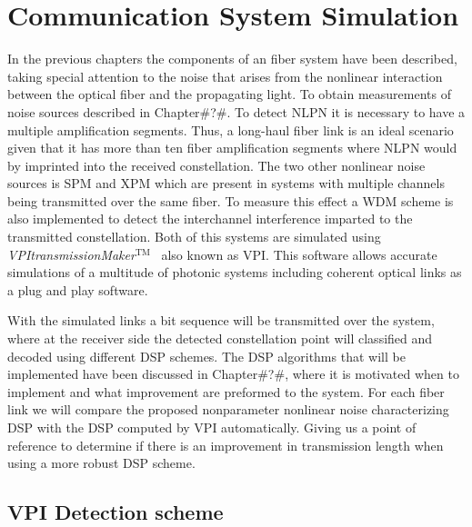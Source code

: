 
\chapter{Communication System Simulation }\label{ch:simu}
In the previous chapters the components of an fiber system have been described, taking special attention to the noise that arises from the nonlinear interaction between the optical fiber and the propagating light. To obtain measurements of noise sources described in Chapter\#?\#. To detect NLPN it is necessary to have a multiple amplification segments. Thus, a long-haul fiber link is an ideal scenario given that it has more than ten fiber amplification segments where NLPN would by imprinted into the received constellation. The two other nonlinear noise sources is SPM and XPM which are present in systems with multiple channels being transmitted over the same fiber. To measure this effect a WDM scheme is also implemented to detect the interchannel interference imparted to the transmitted constellation. Both of this systems are simulated using  \emph{VPItransmissionMaker$^\text{TM}$}~\cite{transmissionvpi} also known as VPI. This software allows accurate simulations of a multitude of photonic systems including coherent optical links as a plug and play software.


With the simulated links a bit sequence will be transmitted over the system, where at the receiver side the detected constellation point will classified and decoded using different DSP schemes. The DSP algorithms that will be implemented have been discussed in Chapter\#?\#, where it is motivated when to implement and what improvement are preformed to the system. For each fiber link we will compare the proposed nonparameter nonlinear noise characterizing DSP with the DSP computed by VPI automatically. Giving us a point of reference to determine if there is an improvement in transmission length when using a more robust DSP scheme. 

 







\section{VPI Detection scheme }\label{sec:VPIdec}


